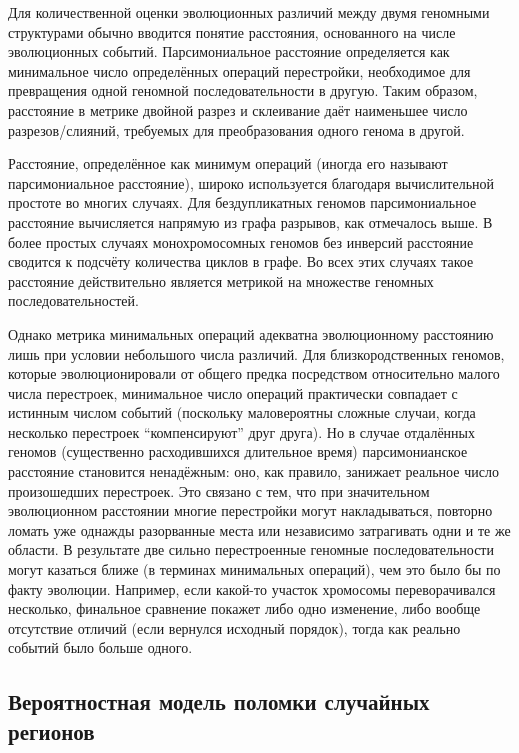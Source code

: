 Для количественной оценки эволюционных различий между двумя геномными структурами обычно вводится понятие расстояния, основанного на числе эволюционных событий.
Парсимониальное расстояние определяется как минимальное число определённых операций перестройки, необходимое для превращения одной геномной последовательности в другую.
Таким образом, расстояние в метрике двойной разрез и склеивание даёт наименьшее число разрезов/слияний, требуемых для преобразования одного генома в другой.

Расстояние, определённое как минимум операций (иногда его называют парсимониальное расстояние), широко используется благодаря вычислительной простоте во многих случаях.
Для бездупликатных геномов парсимониальное расстояние вычисляется напрямую из графа разрывов, как отмечалось выше.
В более простых случаях монохромосомных геномов без инверсий расстояние сводится к подсчёту количества циклов в графе.
Во всех этих случаях такое расстояние действительно является метрикой на множестве геномных последовательностей.

Однако метрика минимальных операций адекватна эволюционному расстоянию лишь при условии небольшого числа различий.
Для близкородственных геномов, которые эволюционировали от общего предка посредством относительно малого числа перестроек, минимальное число операций практически совпадает с истинным числом событий (поскольку маловероятны сложные случаи, когда несколько перестроек ``компенсируют'' друг друга).
Но в случае отдалённых геномов (существенно расходившихся длительное время) парсимонианское расстояние становится ненадёжным: оно, как правило, занижает реальное число произошедших перестроек.
Это связано с тем, что при значительном эволюционном расстоянии многие перестройки могут накладываться, повторно ломать уже однажды разорванные места или независимо затрагивать одни и те же области.
В результате две сильно перестроенные геномные последовательности могут казаться ближе (в терминах минимальных операций), чем это было бы по факту эволюции.
Например, если какой-то участок хромосомы переворачивался несколько, финальное сравнение покажет либо одно изменение, либо вообще отсутствие отличий (если вернулся исходный порядок), тогда как реально событий было больше одного.

\subsection{Вероятностная модель поломки случайных регионов}
\label{subsec:random_breakage}

